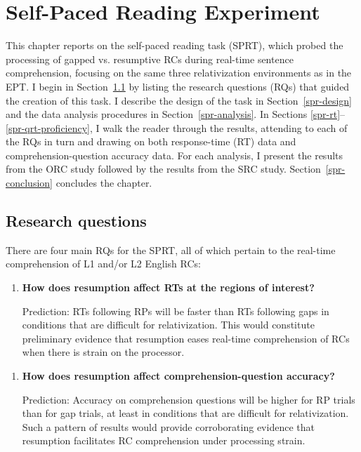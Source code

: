 
\chapter{Self-Paced Reading Experiment}\label{ch-spr}

This chapter reports on the self-paced reading task (SPRT), which probed the processing of gapped vs. resumptive RCs during real-time sentence comprehension, focusing on the same three relativization environments as in the EPT. I begin in Section~\ref{spr-rq} by listing the research questions (RQs) that guided the creation of this task. I describe the design of the task in Section~\ref{spr-design} and the data analysis procedures in Section~\ref{spr-analysis}. In Sections \ref{spr-rt}--\ref{spr-qrt-proficiency}, I walk the reader through the results, attending to each of the RQs in turn and drawing on both response-time (RT) data and comprehension-question accuracy data. For each analysis, I present the results from the ORC study followed by the results from the SRC study. Section~\ref{spr-conclusion} concludes the chapter.

\section{Research questions}\label{spr-rq}

There are four main RQs for the SPRT, all of which pertain to the real-time comprehension of L1 and/or L2 English RCs:

\begin{enumerate}[\bfseries RQ1:,itemsep=5pt]
\item {\bfseries How does resumption affect RTs at the regions of interest?}\par\nobreak
Prediction: RTs following RPs will be faster than RTs following gaps in conditions that are difficult for relativization. This would constitute preliminary evidence that resumption eases real-time comprehension of RCs when there is strain on the processor.
\end{enumerate}\vspace{5pt}

\begin{enumerate}[\bfseries RQ2:,itemsep=5pt]
\item {\bfseries How does resumption affect comprehension-question accuracy?}\par\nobreak
Prediction: Accuracy on comprehension questions will be higher for RP trials than for gap trials, at least in conditions that are difficult for relativization. Such a pattern of results would provide corroborating evidence that resumption facilitates RC comprehension under processing strain.
\end{enumerate}\vspace{5pt}

